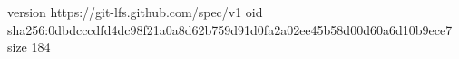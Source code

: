 version https://git-lfs.github.com/spec/v1
oid sha256:0dbdcccdfd4dc98f21a0a8d62b759d91d0fa2a02ee45b58d00d60a6d10b9ece7
size 184
